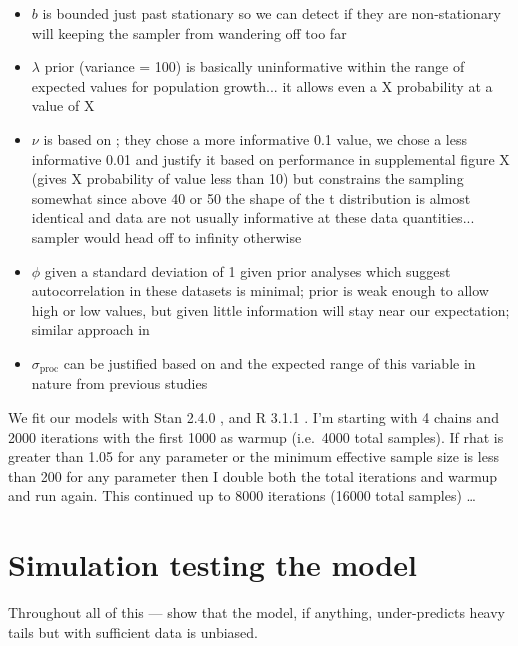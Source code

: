 \documentclass[12pt]{article}
\begin{document}
\begin{itemize}
\item $b$ is bounded just past stationary so we can detect if they are non-stationary will keeping the sampler from wandering off too far

\item $\lambda$ prior (variance = 100) is basically uninformative within the range of expected values for population growth... it allows even a X probability at a value of X

\item $\nu$ is based on \citet{fernandez1998}; they chose a more informative 0.1 value, we chose a less informative 0.01 and justify it based on performance in supplemental figure X (gives X probability of value less than 10) but constrains the sampling somewhat since above 40 or 50 the shape of the t distribution is almost identical and data are not usually informative at these data quantities... sampler would head off to infinity otherwise

\item $\phi$ given a standard deviation of 1 given prior analyses which suggest autocorrelation in these datasets is minimal; prior is weak enough to allow high or low values, but given little information will stay near our expectation; similar approach in \citep{thorson2014a}

\item $\sigma_\mathrm{proc}$ can be justified based on \citet{gelman2006c} and the expected range of this variable in nature from previous studies \citep[e.g.][]{connors2014}
\end{itemize}

We fit our models with Stan 2.4.0 \citep{stan-manual2014}, and R 3.1.1 \citep{r2014}. I'm starting with 4 chains and 2000 iterations with the first 1000 as warmup (i.e.\ 4000 total samples). If rhat is greater than 1.05 for any parameter or the minimum effective sample size is less than 200 for any parameter then I double both the total iterations and warmup and run again. This continued up to 8000 iterations (16000 total samples) \ldots

\section{Simulation testing the model}

Throughout all of this --- show that the model, if anything, under-predicts heavy tails but with sufficient data is unbiased.
\end{document}
